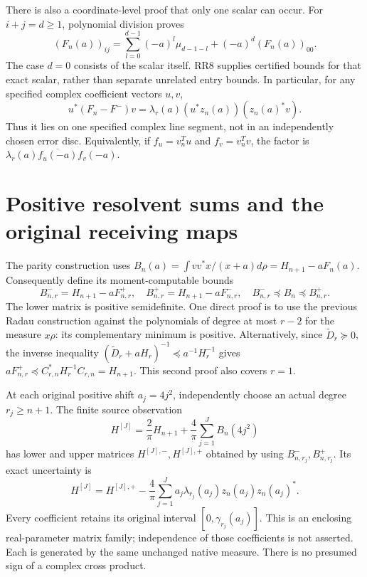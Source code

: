 \documentclass[11pt]{article}
\begin{document}
There is also a coordinate-level proof that only one scalar can occur.
For $i+j=d\ge1$, polynomial division proves
\begin{equation}\tag{RR10}\label{eq:division}
 (F_n(a))_{ij}
 =\sum_{l=0}^{d-1}(-a)^l\mu_{d-1-l}+(-a)^d(F_n(a))_{00}.
\end{equation}
The case $d=0$ consists of the scalar itself. RR8 supplies certified
bounds for that exact scalar, rather than separate unrelated entry bounds.
In particular, for any specified complex coefficient vectors $u,v$,
\begin{equation}\tag{RR11}\label{eq:phase}
 u^*(F_n-F^-)v=\lambda_r(a)(u^*z_n(a))(z_n(a)^*v).
\end{equation}
Thus it lies on one specified complex
line segment, not in an independently chosen error disc. Equivalently,
if $f_u=v_n^Tu$ and $f_v=v_n^Tv$, the factor is
$\lambda_r(a)\overline{f_u(-a)}f_v(-a)$.

\section{Positive resolvent sums and the original receiving maps}
The parity construction uses
$B_n(a)=\int vv^*x/(x+a)d\rho=H_{n+1}-aF_n(a)$.
Consequently define its moment-computable bounds
\begin{equation}\tag{RR12}\label{eq:B}
 B^-_{n,r}=H_{n+1}-aF^+_{n,r},\quad
 B^+_{n,r}=H_{n+1}-aF^-_{n,r},\quad
 B^-_{n,r}\preceq B_n\preceq B^+_{n,r}.
\end{equation}
The lower matrix is positive semidefinite. One direct proof is to
use the previous Radau construction against the polynomials of
degree at most $r-2$ for the measure $x\rho$: its complementary
minimum is positive. Alternatively, since
$\widetilde D_r\succeq0$, the inverse inequality
$(\widetilde D_r+aH_r)^{-1}\preceq a^{-1}H_r^{-1}$ gives
$aF^+_{n,r}\preceq C_{r,n}^*H_r^{-1}C_{r,n}=H_{n+1}$.
This second proof also covers $r=1$.

At each original positive shift $a_j=4j^2$, independently choose
an actual degree $r_j\ge n+1$. The finite source observation
\[
 H^{[J]}=\frac2\pi H_{n+1}
          +\frac4\pi\sum_{j=1}^JB_n(4j^2)
\]
has lower and upper matrices $H^{[J],-},H^{[J],+}$ obtained by
using $B^-_{n,r_j},B^+_{n,r_j}$. Its exact uncertainty is
\begin{equation}\tag{RR13}\label{eq:zonotope}
 H^{[J]}=H^{[J],+}
    -\frac4\pi\sum_{j=1}^J a_j\lambda_{r_j}(a_j)z_n(a_j)z_n(a_j)^*.
\end{equation}
Every coefficient retains its original interval $[0,\gamma_{r_j}(a_j)]$.
This is an enclosing real-parameter matrix family; independence of
those coefficients is not asserted. Each is generated by the same
unchanged native measure. There is no presumed sign of a complex
cross product.
\end{document}
